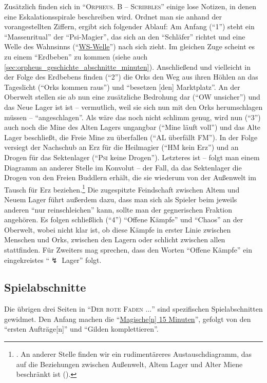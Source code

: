 \documentclass[a5paper,pagesize,numbers=noenddot]{scrbook}
\let\stmaryrdLightning\lightning
\begin{document}
Zusätzlich finden sich in \enquote{\textsc{Orpheus. B -- Scribbles}} einige lose Notizen, in denen eine Eskalationsspirale beschreiben wird.\autocite[Vgl.][S.~10]{orpheus_b_scribbles}
Ordnet man sie anhand der vorangestellten Ziffern, ergibt sich folgender Ablauf:
Am Anfang (\enquote{1}) steht ein \enquote{Massenritual} der \enquote{Psi-Magier}, das sich an den \enquote{Schläfer} richtet und eine Welle des Wahnsinns (\enquote{\uline{WS-Welle}}) nach sich zieht.
Im gleichen Zuge scheint es zu einem \enquote{Erdbeben} zu kommen (siehe auch \autoref{sec:orpheus_geschichte_abschnitte_minuten}).
Anschließend und vielleicht in der Folge des Erdbebens finden (\enquote{2}) die Orks den Weg aus ihren Höhlen an das Tageslicht (\enquote{Orks kommen raus}) und \enquote{besetzen [den] Marktplatz}.
An der Oberwelt stellen sie ab nun eine zusätzliche Bedrohung dar (\enquote{OW unsicher}) und das Neue Lager ist ist -- vermutlich, weil sie sich nun mit den Orks herumschlagen müssen -- \enquote{angeschlagen}.
Als wäre das noch nicht schlimm genug, wird nun (\enquote{3}) auch noch die Mine des Alten Lagers ungangbar (\enquote{Mine läuft voll}) und das Alte Lager beschließt, die Freie Mine zu überfallen (\enquote{AL überfällt FM}).
In der Folge versiegt der Nachschub an Erz für die Heilmagier (\enquote{HM kein Erz}) und an Drogen für das Sektenlager (\enquote{\textsc{Psi} keine Drogen}).
Letzteres ist -- folgt man einem Diagramm an anderer Stelle im Konvolut -- der Fall, da das Sektenlager die Drogen von den Freien Buddlern erhält, die sie wiederum von der Außenwelt im Tausch für Erz beziehen.\footnote{\autocite[Vgl.][S.~13]{orpheus_b_scribbles}. An anderer Stelle finden wir ein rudimentäreres Austauschdiagramm, das auf die Beziehungen zwischen Außenwelt, Altem Lager und Alter Miene beschränkt ist (\autocite[vgl.][S.~6]{orpheus_b_scribbles}).}
Die zugespitzte Feindschaft zwischen Altem und Neuem Lager führt außerdem dazu, dass man sich als Spieler beim jeweils anderen \enquote{nur reinschleichen} kann, sollte man der gegnerischen Fraktion angehören.
Es folgen schließlich (\enquote{4}) \enquote{Offene Kämpfe} und \enquote{Chaos} an der Oberwelt, wobei nicht klar ist, ob diese Kämpfe in erster Linie zwischen Menschen und Orks, zwischen den Lagern oder schlicht zwischen allen stattfinden.
Für Zweiters mag sprechen, dass den Worten \enquote{Offene Kämpfe} ein eingekreistes \enquote{$\stmaryrdLightning$ Lager} folgt.


\subsection{Spielabschnitte}\label{sec:orpheus_geschichte_abschnitte}
Die übrigen drei Seiten in \enquote{\textsc{Der rote Faden $\ldots$}} sind spezifischen Spielabschnitten gewidmet.
Den Anfang machen die \enquote{\uline{Magische[n] 15 Minuten}}, gefolgt von den \enquote{ersten Aufträge[n]} und \enquote{Gilden komplettieren}.
\end{document}
